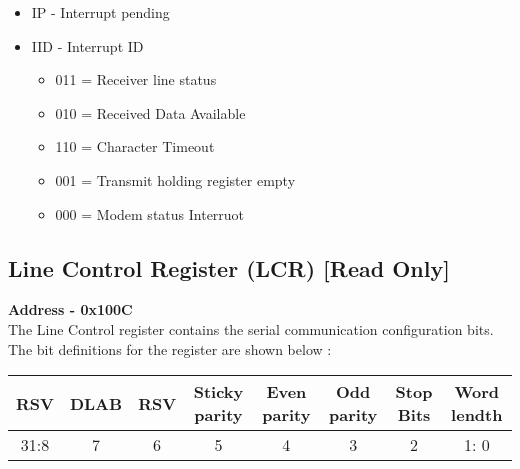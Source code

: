 \documentclass[12pt,a4paper]{report}
\begin{document}
\begin{itemize}
\item IP - Interrupt pending
\item IID -   Interrupt ID 
\begin{itemize}
\item 011 = Receiver line status
\item 010 = Received Data Available
\item 110 = Character Timeout
\item 001 = Transmit holding register empty
\item 000 = Modem status Interruot

\end{itemize}
\end{itemize}

\subsection{Line Control Register (LCR)  [Read Only] }
\hspace{1.6cm}
\textbf{Address - 0x100C}
\\
\hspace{1.6cm}
The Line Control register contains the
serial communication configuration bits. The bit definitions for the register are shown below :

\begin{center}
\begin{tabular}{|c|c|c|c|c|c|c|c| } 
 \hline
 RSV   & DLAB & RSV &  Sticky parity &  Even parity & Odd parity & Stop Bits & Word lendth \\ 
\hline
31:8 & 7 & 6 & 5 & 4 & 3  &  2 & 1: 0\\
 \hline
\end{tabular}
\end{center}
\end{document}
